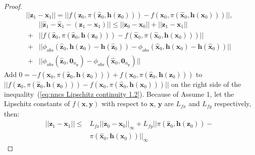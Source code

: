 \documentclass[conference]{IEEEtran}
\newtheorem{proof}{\bf Proof}
\newcommand{\myvec}[1]{\boldsymbol{#1}}
\begin{document}
\begin{proof}
\begin{equation}
    \end{equation}
    \begin{equation}~\label{eq:nncs Lipschitz continuity 1.1}
      ||\myvec{z}_{1} - \myvec{x}_{1}|| = ||f(\myvec{z}_{0}, \pi(\hat{\myvec{z}}_{0}, \myvec{h}(\myvec{z}_{0}))) - f(\myvec{x}_{0}, \pi(\hat{\myvec{x}}_{0}, \myvec{h}(\myvec{x}_{0})))||, 
    \end{equation}
    \begin{equation}~\label{eq:nncs Lipschitz continuity 1.2}
      \begin{aligned}
        &||\hat{\myvec{z}}_{1} - \hat{\myvec{x}}_{1}  - (\myvec{z}_{1} - \myvec{x}_{1})|| \leq ||\myvec{z}_{0} - \myvec{x}_{0}||+ ||\myvec{z}_{1} - \myvec{x}_{1}||\\
        +&||f(\hat{\myvec{z}}_{0}, \pi(\hat{\myvec{z}}_{0}, \myvec{h}(\myvec{z}_{0}))) - f(\hat{\myvec{x}}_{0}, \pi(\hat{\myvec{x}}_{0}, \myvec{h}(\myvec{x}_{0})))||
        \\+&|| \phi_{obs}( \hat{\myvec{z}}_{0}, \myvec{h}(\myvec{z}_{0}) - \myvec{h}(\hat{\myvec{z}}_{0}) ) - 
        \phi_{obs}( \hat{\myvec{x}}_{0}, \myvec{h}(\myvec{x}_{0}) - \myvec{h}(\hat{\myvec{x}}_{0}) )||\\
         +&|| \phi_{obs}( \hat{\myvec{z}}_{0}, \myvec{0}_{n_{\myvec{y}}} ) - \phi_{obs}( \hat{\myvec{x}}_{0}, \myvec{0}_{n_{\myvec{y}}} ) ||
      \end{aligned}
    \end{equation}
    Add $0 = -f(\myvec{x}_{0}, \pi(\hat{\myvec{z}}_{0},\myvec{h}(\myvec{z}_{0}))) + f(\myvec{x}_{0}, 
    \pi(\hat{\myvec{z}}_{0},\myvec{h}(\myvec{z}_{0})))$ 
    to $||f(\myvec{z}_{0}, \pi(\hat{\myvec{z}}_{0}, 
    \myvec{h}(\myvec{z}_{0}))) - f(\myvec{x}_{0}, \pi(\hat{\myvec{x}}_{0}, \myvec{h}(\myvec{x}_{0})))||$ 
    on the right side of the inequality~(\ref{eq:nncs Lipschitz continuity 1.2}). 
    Because of Assume 1, 
    let the Lipschitz constants of $f(\myvec{x},\myvec{y})$ 
    with respect to $\myvec{x}$, $\myvec{y}$ are 
    $L_{fx}$ and $L_{fy}$ respectively, then: 
    \begin{equation}~\label{eq:nncs Lipschitz continuity 2}
        \begin{aligned}
            ||\myvec{z}_{1} - \myvec{x}_{1}|| \leq& L_{fx}||\myvec{z}_{0} - \myvec{x}_{0}||_{\infty} + 
            L_{fy}||\pi(\hat{\myvec{z}}_{0}, \myvec{h}(\myvec{z}_{0})) - \\
            &\pi(\hat{\myvec{x}}_{0}, \myvec{h}(\myvec{x}_{0}))||_{\infty}
        \end{aligned}

\end{equation}
\end{proof}
\end{document}
